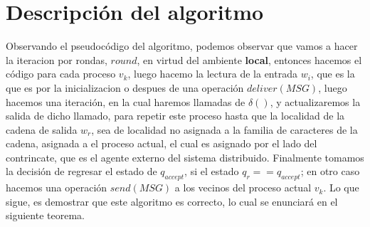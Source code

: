 \documentclass[10pt]{report}
\begin{document}
    \section{Descripción del algoritmo}\label{sec:descripción-del-algoritmo}
    Observando el pseudocódigo del algoritmo, podemos observar que vamos a hacer la iteracion por rondas, $round$, en
    virtud del ambiente \textbf{local}, entonces hacemos el código para cada proceso $v_{k}$, luego hacemo la lectura de
    la entrada $w_{i}$, que es la que es por la inicializacion o despues de una operación $deliver(MSG)$, luego hacemos una
    iteración, en la cual haremos llamadas de $\delta()$, y actualizaremos la salida de dicho llamado, para repetir este
    proceso hasta que la localidad de la cadena de salida $w_{r}$, sea de localidad no asignada a la familia de caracteres
    de la cadena, asignada a el proceso actual, el cual es asignado por el lado del contrincate, que es el agente externo del sistema distribuido.
    Finalmente tomamos la decisión de regresar el estado de $q_{accept}$, si el estado $q_{r}==q_{accept}$;
    en otro caso hacemos una operación $send(MSG)$ a los vecinos del proceso actual $v_{k}$.
    \newline
    Lo que sigue, es demostrar que este algoritmo es correcto, lo cual se enunciará en el siguiente teorema.
\end{document}
